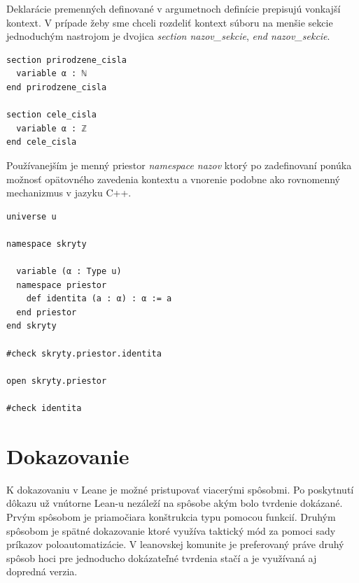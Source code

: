 \documentclass[a4paper,10pt,oneside]{report}%
\begin{document}
    Deklarácie premenných definované v argumetnoch definície prepisujú vonkajší kontext.
    V prípade žeby sme chceli rozdeliť kontext súboru na menšie sekcie jednoduchým
nastrojom je dvojica \emph{section nazov\_sekcie}, \emph{end nazov\_sekcie}.
\begin{lstlisting}
section prirodzene_cisla
  variable α : ℕ
end prirodzene_cisla

section cele_cisla
  variable α : ℤ
end cele_cisla
\end{lstlisting}
    Používanejším je menný priestor \emph{namespace nazov} ktorý po zadefinovaní ponúka
možnosť opätovného zavedenia kontextu a vnorenie podobne ako rovnomenný mechanizmus
v jazyku C++.
\begin{lstlisting}
universe u

namespace skryty

  variable (α : Type u)
  namespace priestor
    def identita (a : α) : α := a
  end priestor
end skryty

#check skryty.priestor.identita

open skryty.priestor

#check identita
\end{lstlisting}
\section{Dokazovanie}

    K dokazovaniu v Leane je možné pristupovať viacerými spôsobmi.
    Po poskytnutí dôkazu už vnútorne Lean-u nezáleží na spôsobe akým bolo tvrdenie
dokázané.
    Prvým spôsobom je priamočiara konštrukcia typu pomocou funkcií.
    Druhým spôsobom je spätné dokazovanie ktoré využíva taktický mód za pomoci
sady príkazov poloautomatizácie.
    V leanovskej komunite je preferovaný práve druhý spôsob hoci pre jednoducho
dokázateľné tvrdenia stačí a je využívaná aj dopredná verzia.
\end{document}
